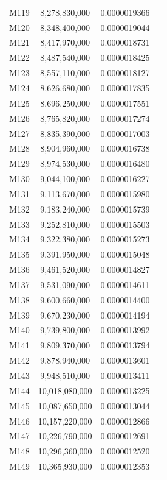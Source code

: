 \documentclass[11pt, a4paper]{article}
\begin{document}
\begin{longtable}{@{} c c c l @{}}
  M119 & 8,278,830,000 & 0.0000019366 &  \\
  M120 & 8,348,400,000 & 0.0000019044 &  \\
  M121 & 8,417,970,000 & 0.0000018731 &  \\
  M122 & 8,487,540,000 & 0.0000018425 &  \\
  M123 & 8,557,110,000 & 0.0000018127 &  \\
  M124 & 8,626,680,000 & 0.0000017835 &  \\
  M125 & 8,696,250,000 & 0.0000017551 &  \\
  M126 & 8,765,820,000 & 0.0000017274 &  \\
  M127 & 8,835,390,000 & 0.0000017003 &  \\
  M128 & 8,904,960,000 & 0.0000016738 &  \\
  M129 & 8,974,530,000 & 0.0000016480 &  \\
  M130 & 9,044,100,000 & 0.0000016227 &  \\
  M131 & 9,113,670,000 & 0.0000015980 &  \\
  M132 & 9,183,240,000 & 0.0000015739 &  \\
  M133 & 9,252,810,000 & 0.0000015503 &  \\
  M134 & 9,322,380,000 & 0.0000015273 &  \\
  M135 & 9,391,950,000 & 0.0000015048 &  \\
  M136 & 9,461,520,000 & 0.0000014827 &  \\
  M137 & 9,531,090,000 & 0.0000014611 &  \\
  M138 & 9,600,660,000 & 0.0000014400 &  \\
  M139 & 9,670,230,000 & 0.0000014194 &  \\
  M140 & 9,739,800,000 & 0.0000013992 &  \\
  M141 & 9,809,370,000 & 0.0000013794 &  \\
  M142 & 9,878,940,000 & 0.0000013601 &  \\
  M143 & 9,948,510,000 & 0.0000013411 &  \\
  M144 & 10,018,080,000 & 0.0000013225 &  \\
  M145 & 10,087,650,000 & 0.0000013044 &  \\
  M146 & 10,157,220,000 & 0.0000012866 &  \\
  M147 & 10,226,790,000 & 0.0000012691 &  \\
  M148 & 10,296,360,000 & 0.0000012520 &  \\
  M149 & 10,365,930,000 & 0.0000012353 &  \\

\end{longtable}
\end{document}
